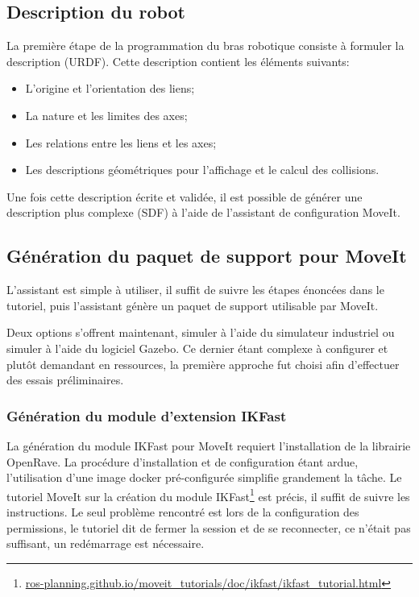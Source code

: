 \subsection{Description du robot}
La première étape de la programmation du bras robotique consiste à formuler la description (URDF). Cette description contient les éléments suivants:
\begin{itemize}
    \item L'origine et l'orientation des liens;
    \item La nature et les limites des axes;
    \item Les relations entre les liens et les axes;
    \item Les descriptions géométriques pour l'affichage et le calcul des collisions.
\end{itemize}

Une fois cette description écrite et validée, il est possible de générer une description plus complexe (SDF) à l'aide de l'assistant de configuration MoveIt. 

\subsection{Génération du paquet de support pour MoveIt}
L'assistant est simple à utiliser, il suffit de suivre les étapes énoncées dans le tutoriel, puis l'assistant génère un paquet de support utilisable par MoveIt.

Deux options s'offrent maintenant, simuler à l'aide du simulateur industriel ou simuler à l'aide du logiciel Gazebo. Ce dernier étant complexe à configurer et plutôt demandant en ressources, la première approche fut choisi afin d'effectuer des essais préliminaires.

\subsubsection{Génération du module d'extension IKFast}
La génération du module IKFast pour MoveIt requiert l'installation de la librairie OpenRave. La procédure d'installation et de configuration étant ardue, l'utilisation d'une image docker pré-configurée simplifie grandement la tâche. Le tutoriel MoveIt sur la création du module IKFast\footnote{\href{https://ros-planning.github.io/moveit_tutorials/doc/ikfast/ikfast_tutorial.html}{ros-planning.github.io/moveit\_tutorials/doc/ikfast/ikfast\_tutorial.html}} est précis, il suffit de suivre les instructions. Le seul problème rencontré est lors de la configuration des permissions, le tutoriel dit de fermer la session et de se reconnecter, ce n'était pas suffisant, un redémarrage est nécessaire.

